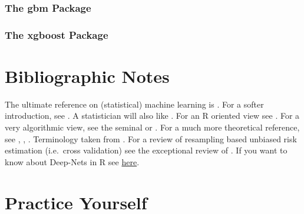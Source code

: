 \documentclass[]{book}
\theoremstyle{definition}
\theoremstyle{definition}
\theoremstyle{definition}
\theoremstyle{remark}
\begin{document}
\subsubsection{The gbm Package}\label{the-gbm-package}

\subsubsection{The xgboost Package}\label{the-xgboost-package}

\section{Bibliographic Notes}\label{bibliographic-notes-6}

The ultimate reference on (statistical) machine learning is
\citet{friedman2001elements}. For a softer introduction, see
\citet{james2013introduction}. A statistician will also like
\citet{ripley2007pattern}. For an R oriented view see
\citet{lantz2013machine}. For a very algorithmic view, see the seminal
\citet{leskovec2014mining} or \citet{conway2012machine}. For a much more
theoretical reference, see \citet{mohri2012foundations},
\citet{vapnik2013nature}, \citet{shalev2014understanding}. Terminology
taken from \citet{sammut2011encyclopedia}. For a review of resampling
based unbiased risk estimation (i.e.~cross validation) see the
exceptional review of \citet{arlot2010survey}. If you want to know about
Deep-Nets in R see
\href{https://www.datacamp.com/community/tutorials/keras-r-deep-learning}{here}.

\section{Practice Yourself}\label{practice-yourself-6}
\end{document}
